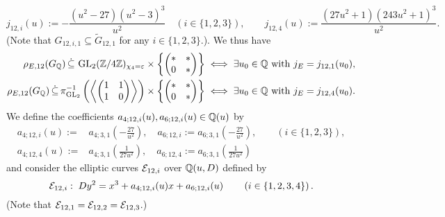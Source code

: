 \[
j_{12,i}(u) := - \frac{(u^2-27)(u^2-3)^3}{u^2} \quad \left( i \in \{1, 2, 3 \} \right), \quad\quad j_{12,4}(u) := \frac{(27u^2+1)(243u^2+1)^3}{u^2}.
\]
(Note that $G_{12,i,1} \subseteq \tilde{G}_{12,1}$ for any $i \in \{1, 2, 3 \}$.). We thus have
\[
\begin{split}
\rho_{E,12}(G_{\mathbb{Q}}) \, \dot\subseteq \, \operatorname{GL}_2(\mathbb{Z}/4\mathbb{Z})_{\chi_4 = \varepsilon} \times \left\{ \begin{pmatrix} * & * \\ 0 & * \end{pmatrix} \right\} \; &\Longleftrightarrow \; \exists u_0 \in \mathbb{Q} \text{ with } j_E = j_{12,1}(u_0), \\
\rho_{E,12}(G_{\mathbb{Q}}) \, \dot\subseteq \, \pi_{\operatorname{GL}_2}^{-1} \left( \left\langle \begin{pmatrix} 1 & 1 \\ 1 & 0 \end{pmatrix} \right\rangle \right) \times \left\{ \begin{pmatrix} * & * \\ 0 & * \end{pmatrix} \right\} \; &\Longleftrightarrow \; \exists u_0 \in \mathbb{Q} \text{ with } j_E = j_{12,4}(u_0).
\end{split}
\]
We define the coefficients $a_{4;12,i}(u), a_{6;12,i}(u) \in \mathbb{Q}(u)$ by
\[
\begin{split}
a_{4;12,i}(u) :=& a_{4;3,1}\left( -\frac{27}{u^2} \right), \quad a_{6;12,i} := a_{6;3,1}\left( -\frac{27}{u^2} \right), \quad\quad \left( i \in \{ 1, 2, 3 \} \right), \\
a_{4;12,4}(u) :=& a_{4;3,1}\left( \frac{1}{27u^2} \right), \quad a_{6;12,4} := a_{6;3,1}\left( \frac{1}{27u^2} \right)
\end{split}
\]
and consider the elliptic curves $\mathcal{E}_{12,i}$ over $\mathbb{Q}(u,D)$ defined by 
\[
\mathcal{E}_{12,i} : \; D y^2 = x^3 + a_{4;12,i}(u) x + a_{6;12,i}(u) \quad\quad \left( i \in \{ 1, 2, 3, 4 \} \right).
\]
(Note that $\mathcal{E}_{12,1} = \mathcal{E}_{12,2} = \mathcal{E}_{12,3}$.) 

